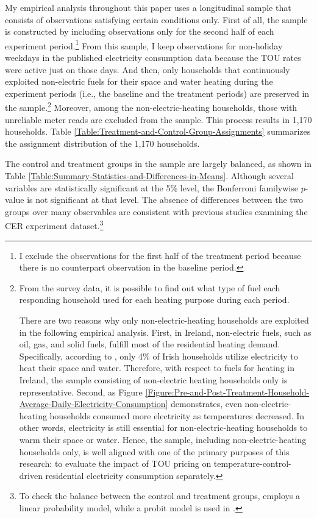 My empirical analysis throughout this paper uses a longitudinal sample that consists of observations satisfying certain conditions only. First of all, the sample is constructed by including observations only for the second half of each experiment period.\footnote{I exclude the observations for the first half of the treatment period because there is no counterpart observation in the baseline period.} From this sample, I keep observations for non-holiday weekdays in the published electricity consumption data because the TOU rates were active just on those days. And then, only households that continuously exploited non-electric fuels for their space and water heating during the experiment periods (i.e., the baseline and the treatment periods) are preserved in the sample.\footnote{From the survey data, it is possible to find out what type of fuel each responding household used for each heating purpose during each period. \par
There are two reasons why only non-electric-heating households are exploited in the following empirical analysis. First, in Ireland, non-electric fuels, such as oil, gas, and solid fuels, fulfill most of the residential heating demand. Specifically, according to \cite{Heating-and-Cooling-in-Ireland-Today_SEAI_2022}, only 4\% of Irish households utilize electricity to heat their space and water. Therefore, with respect to fuels for heating in Ireland, the sample consisting of non-electric heating households only is representative. Second, as Figure \ref{Figure:Pre-and-Post-Treatment-Household-Average-Daily-Electricity-Consumption} demonstrates, even non-electric-heating households consumed more electricity as temperatures decreased. In other words, electricity is still essential for non-electric-heating households to warm their space or water. Hence, the sample, including non-electric-heating households only, is well aligned with one of the primary purposes of this research: to evaluate the impact of TOU pricing on temperature-control-driven residential electricity consumption separately.} Moreover, among the non-electric-heating households, those with unreliable meter reads are excluded from the sample. This process results in 1,170 households. Table \ref{Table:Treatment-and-Control-Group-Assignments} summarizes the assignment distribution of the 1,170 households. 

The control and treatment groups in the sample are largely balanced, as shown in Table \ref{Table:Summary-Statistics-and-Differences-in-Means}. Although several variables are statistically significant at the 5\% level, the Bonferroni familywise $p$-value is not significant at that level. The absence of differences between the two groups over many observables are consistent with previous studies examining the CER experiment dataset.\footnote{To check the balance between the control and treatment groups, \cite{Peaking-Interest:How-Awareness-Drives-the-Effectiveness-of-Time-of-Use-Electricity-Pricing_Prest_2020} employs a linear probability model, while a probit model is used in \cite{The-Effect-of-Information-on-TOU-Electricity-Use:An-Irish-Residential-Study_Pon_2017}.} 

